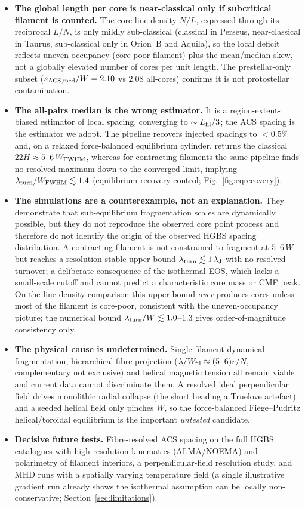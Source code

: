 \documentclass[usenatbib,twoside,twocolumn]{mnras}
\begin{document}
\begin{itemize}
    \item \textbf{The global length per core is near-classical only if subcritical filament is counted.} The core line density $N/L$, expressed through its reciprocal $L/N$, is only mildly sub-classical (classical in Perseus, near-classical in Taurus, sub-classical only in Orion~B and Aquila), so the local deficit reflects uneven occupancy (core-poor filament) plus the mean/median skew, not a globally elevated number of cores per unit length. The prestellar-only subset ($s_{\rm ACS,med}/W=2.10$ vs $2.08$ all-cores) confirms it is not protostellar contamination.
    \item \textbf{The all-pairs median is the wrong estimator.} It is a region-extent-biased estimator of local spacing, converging to $\sim L_{\rm fil}/3$; the ACS spacing is the estimator we adopt. The pipeline recovers injected spacings to $<0.5\%$ and, on a relaxed force-balanced equilibrium cylinder, returns the classical $22H\approx5$--$6\,W_{\rm FWHM}$, whereas for contracting filaments the same pipeline finds no resolved maximum down to the converged limit, implying $\lambda_{\rm turn}/W_{\rm FWHM}\lesssim1.4$ (equilibrium-recovery control; Fig.~\ref{fig:eqrecovery}).
    \item \textbf{The simulations are a counterexample, not an explanation.} They demonstrate that sub-equilibrium fragmentation scales are dynamically possible, but they do not reproduce the observed core point process and therefore do not identify the origin of the observed HGBS spacing distribution. A contracting filament is not constrained to fragment at $5$--$6\,W$ but reaches a resolution-stable upper bound $\lambda_{\rm turn}\lesssim1\,\lambda_{\rm J}$ with no resolved turnover; a deliberate consequence of the isothermal EOS, which lacks a small-scale cutoff and cannot predict a characteristic core mass or CMF peak. On the line-density comparison this upper bound \emph{over}-produces cores unless most of the filament is core-poor, consistent with the uneven-occupancy picture; the numerical bound $\lambda_{\rm turn}/W\lesssim1.0$--$1.3$ gives order-of-magnitude consistency only.
    \item \textbf{The physical cause is undetermined.} Single-filament dynamical fragmentation, hierarchical-fibre projection ($\lambda/W_{\rm fil}\approx(5$--$6)r/N$, complementary not exclusive) and helical magnetic tension all remain viable and current data cannot discriminate them. A resolved ideal perpendicular field drives monolithic radial collapse (the short beading a Truelove artefact) and a seeded helical field only pinches $W$, so the force-balanced Fiege--Pudritz helical/toroidal equilibrium is the important \emph{untested} candidate.
    \item \textbf{Decisive future tests.} Fibre-resolved ACS spacing on the full HGBS catalogues with high-resolution kinematics (ALMA/NOEMA) and polarimetry of filament interiors, a perpendicular-field resolution study, and MHD runs with a spatially varying temperature field (a single illustrative gradient run already shows the isothermal assumption can be locally non-conservative; Section~\ref{sec:limitations}).
    \end{itemize}
\end{document}
